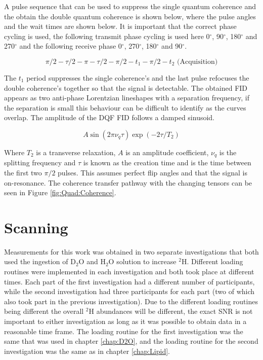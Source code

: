 \documentclass[class=article, crop=false]{standalone}
\begin{document}
A pulse sequence that can be used to suppress the single quantum coherence and the obtain the double quantum coherence is shown below\cite{Sharf1995DetectionNMR-Spectroscopy}, where the pulse angles and the wait times are shown below. It is important that the correct phase cycling is used\cite{Bodenhausen1984SelectionExperiments}, the following transmit phase cycling is used here 0$^\circ$, 90$^\circ$, 180$^\circ$ and 270$^\circ$ and the following receive phase 0$^\circ$, 270$^\circ$, 180$^\circ$ and 90$^\circ$. 

\begin{equation}
    \pi/2-\tau/2-\pi-\tau/2-\pi/2-t_1-\pi/2-t_2 \textrm{ (Acquisition)}
    \label{eqn:Quad:Pulse}
\end{equation}

The $t_1$ period suppresses the single coherence's and the last pulse refocuses the double coherence's together so that the signal is detectable. The obtained FID appears as two anti-phase Lorentzian lineshapes with a separation frequency, if the separation is small this behaviour can be difficult to identify as the curves overlap. The amplitude of the DQF FID follows a damped sinusoid.

\begin{equation}
    A\sin(2\pi\nu_q\tau)\exp(-2\tau/T_2)
    \label{eqn:Quad:Amplitude}
\end{equation}

Where $T_2$ is a transverse relaxation, $A$ is an amplitude coefficient, $\nu_q$ is the splitting frequency and $\tau$ is known as the creation time and is the time between the first two $\pi/2$ pulses. This assumes perfect flip angles and that the signal is on-resonance. The coherence transfer pathway with the changing tensors can be seen in Figure \ref{fig:Quad:Coherence}.


\section{Scanning}

Measurements for this work was obtained in two separate investigations that both used the ingestion of D$_2$O and H$_2$O solution to increase $^2$H. Different loading routines were implemented in each investigation and both took place at different times. Each part of the first investigation had a different number of participants, while the second investigation had three participants for each part (two of which also took part in the previous investigation). Due to the different loading routines being different the overall $^2$H abundances will be different, the exact SNR is not important to either investigation as long as it was possible to obtain data in a reasonable time frame. The loading routine for the first investigation was the same that was used in chapter \ref{chap:D2O}, and the loading routine for the second investigation was the same as in chapter \ref{chap:Lipid}.
\end{document}
